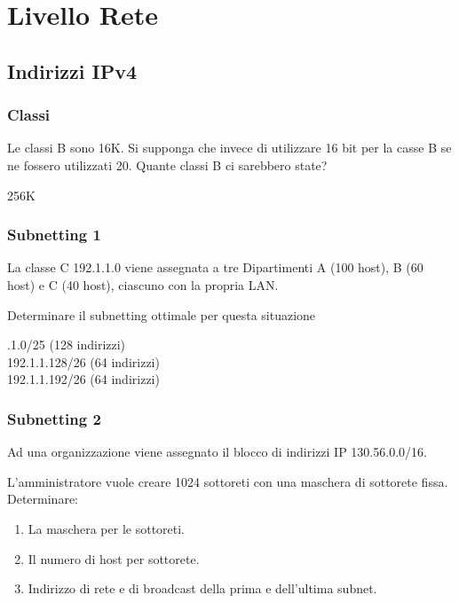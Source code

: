 \section{Livello Rete}
    \subsection{Indirizzi IPv4}
        \subsubsection{Classi}
            \problem
            
            Le classi B sono 16K. Si supponga che invece di utilizzare 16 bit per la casse B se ne fossero utilizzati 20. Quante classi B ci sarebbero state?

            \solution
            256K
        
        \subsubsection{Subnetting 1}
            \problem
            La classe C 192.1.1.0 viene assegnata a tre Dipartimenti A (100 host), B (60 host) e C (40 host), ciascuno con la propria LAN.

            Determinare il subnetting ottimale per questa situazione
            
            .1.0/25 (128 indirizzi)\\
            192.1.1.128/26  (64 indirizzi)\\
            192.1.1.192/26 (64 indirizzi)
        
        \subsubsection{Subnetting 2}
            \problem
            Ad una organizzazione viene assegnato il blocco di indirizzi IP 130.56.0.0/16.

            L'amministratore vuole creare 1024 sottoreti con una maschera di sottorete fissa. Determinare:
            \begin{enumerate}
                \item La maschera per le sottoreti.
                \item Il numero di host per sottorete.
                \item Indirizzo di rete e di broadcast della prima e dell'ultima subnet.
            \end{enumerate}

